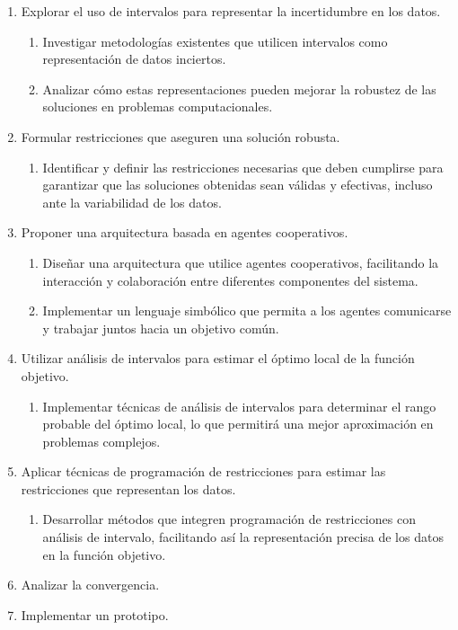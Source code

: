 \documentclass{article}
\begin{document}
\begin{enumerate}
    \item Explorar el uso de intervalos para representar la incertidumbre en los datos.
    \begin{enumerate}
        \item Investigar metodologías existentes que utilicen intervalos como representación de datos inciertos.
        \item Analizar cómo estas representaciones pueden mejorar la robustez de las soluciones en problemas computacionales.
    \end{enumerate}

    \item Formular restricciones que aseguren una solución robusta.
    \begin{enumerate}
        \item Identificar y definir las restricciones necesarias que deben cumplirse para garantizar que las soluciones obtenidas sean válidas y efectivas, incluso ante la variabilidad de los datos.
    \end{enumerate}

    \item Proponer una arquitectura basada en agentes cooperativos.
    \begin{enumerate}
        \item Diseñar una arquitectura que utilice agentes cooperativos, facilitando la interacción y colaboración entre diferentes componentes del sistema.
        \item Implementar un lenguaje simbólico que permita a los agentes comunicarse y trabajar juntos hacia un objetivo común.
    \end{enumerate}

    \item Utilizar análisis de intervalos para estimar el óptimo local de la función objetivo.
    \begin{enumerate}
        \item Implementar técnicas de análisis de intervalos para determinar el rango probable del óptimo local, lo que permitirá una mejor aproximación en problemas complejos.
    \end{enumerate}

    \item Aplicar técnicas de programación de restricciones para estimar las restricciones que representan los datos.
    \begin{enumerate}
        \item Desarrollar métodos que integren programación de restricciones con análisis de intervalo, facilitando así la representación precisa de los datos en la función objetivo.
    \end{enumerate}

    \item Analizar la convergencia.

    \item Implementar un prototipo.
\end{enumerate}
\end{document}
